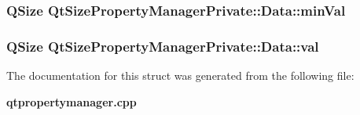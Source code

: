 \subsubsection[{min\+Val}]{\setlength{\rightskip}{0pt plus 5cm}Q\+Size Qt\+Size\+Property\+Manager\+Private\+::\+Data\+::min\+Val}\label{structQtSizePropertyManagerPrivate_1_1Data_ad8c46a205042332d880334595f0753e3}
\subsubsection[{val}]{\setlength{\rightskip}{0pt plus 5cm}Q\+Size Qt\+Size\+Property\+Manager\+Private\+::\+Data\+::val}\label{structQtSizePropertyManagerPrivate_1_1Data_afccae7164c663285b73a8fdab65aab0c}


The documentation for this struct was generated from the following file\+:\begin{DoxyCompactItemize}
\item 
{\bf qtpropertymanager.\+cpp}\end{DoxyCompactItemize}
